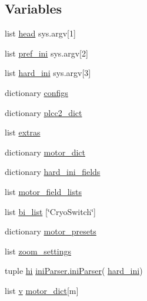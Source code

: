 \subsection*{Variables}
\begin{DoxyCompactItemize}
\item 
list \hyperlink{namespacemk__pgpmac__redis_a760ff4955cbf5beef4ae36a28c30b01a}{head} sys.\-argv\mbox{[}1\mbox{]}
\item 
list \hyperlink{namespacemk__pgpmac__redis_a38c785af5201403976e1267c47ea5096}{pref\-\_\-ini} sys.\-argv\mbox{[}2\mbox{]}
\item 
list \hyperlink{namespacemk__pgpmac__redis_a5864d9c27cbe61534756880cbfebe4f1}{hard\-\_\-ini} sys.\-argv\mbox{[}3\mbox{]}
\item 
dictionary \hyperlink{namespacemk__pgpmac__redis_a9dc9b1bd47efd207604312cd60637526}{configs}
\item 
dictionary \hyperlink{namespacemk__pgpmac__redis_a70d6a840305f17ce4f2936166fa2750e}{plcc2\-\_\-dict}
\item 
list \hyperlink{namespacemk__pgpmac__redis_a3c74008dcad02dee86570e9a0c498a14}{extras}
\item 
dictionary \hyperlink{namespacemk__pgpmac__redis_ad8583d4fe88c4c98af73d2858c51c660}{motor\-\_\-dict}
\item 
dictionary \hyperlink{namespacemk__pgpmac__redis_a8257226983aee079ec66f5cc67e194ec}{hard\-\_\-ini\-\_\-fields}
\item 
list \hyperlink{namespacemk__pgpmac__redis_a7228dc1b6ecec376538db1efe8c05ffb}{motor\-\_\-field\-\_\-lists}
\item 
list \hyperlink{namespacemk__pgpmac__redis_a961bfabfbdcbf5b749f6e6ecdc733619}{bi\-\_\-list} \mbox{[}\char`\"{}Cryo\-Switch\char`\"{}\mbox{]}
\item 
dictionary \hyperlink{namespacemk__pgpmac__redis_a2a04d8d0b7270384d1fac674c29e774a}{motor\-\_\-presets}
\item 
list \hyperlink{namespacemk__pgpmac__redis_ad91bac9be746f99e1cf1f8e28ff348be}{zoom\-\_\-settings}
\item 
tuple \hyperlink{namespacemk__pgpmac__redis_af0e472a4df25fc5c1660ef07226689a8}{hi} \hyperlink{classiniParser_1_1iniParser}{ini\-Parser.\-ini\-Parser}( \hyperlink{namespacemk__pgpmac__redis_a5864d9c27cbe61534756880cbfebe4f1}{hard\-\_\-ini})
\item 
list \hyperlink{namespacemk__pgpmac__redis_ac732d49b0afca9a9951e3a252bae42fc}{v} \hyperlink{namespacemk__pgpmac__redis_ad8583d4fe88c4c98af73d2858c51c660}{motor\-\_\-dict}\mbox{[}m\mbox{]}

\end{DoxyCompactItemize}
